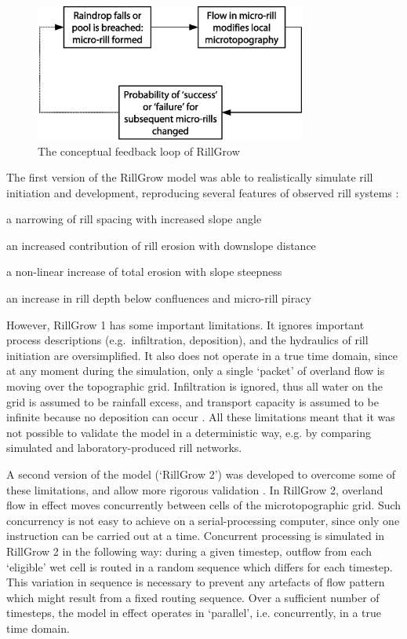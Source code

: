 \begin{figure}[htbp]
  \centering
    \includegraphics[width=0.80\textwidth]
{./img/rillgrow_feedback_concept}
  \caption[The conceptual feedback loop of RillGrow]{The conceptual
feedback loop of RillGrow \citep[From][]{favis1998-353}}
  \label{fig:rillgrow_feedback_concept}
\end{figure}

The first version of the RillGrow model was able to realistically simulate rill
initiation and development, reproducing several features of observed rill
systems \citep{favis-mortlock1996-248,favis1998-353}:
\begin{enumerate*}
  \item a narrowing of rill spacing with increased slope angle
  \item an increased contribution of rill erosion with downslope distance
  \item a non-linear increase of total erosion with slope steepness
  \item an increase in rill depth below confluences and micro-rill piracy
\end{enumerate*}

However, RillGrow 1 has some important limitations. It ignores important process
descriptions (e.g.\ infiltration, deposition), and the hydraulics of rill
initiation are oversimplified. It also does not operate in a true time domain,
since at any moment during the simulation, only a single `packet' of overland
flow is moving over the topographic grid. Infiltration is ignored, thus all
water on the grid is assumed to be rainfall excess, and transport capacity is
assumed to be infinite because no deposition can occur \citep{favis2000-2173}.
All these limitations meant that it was not possible to validate the model in a
deterministic way, e.g. by comparing simulated and laboratory-produced rill
networks.

A second version of the model (`RillGrow 2') was developed to overcome some of
these limitations, and allow more rigorous validation \citep{favis2000-2173}. In
RillGrow 2, overland flow in effect moves concurrently between cells of the
microtopographic grid. Such concurrency is not easy to achieve on a
serial-processing computer, since only one instruction can be carried out at a
time. Concurrent processing is simulated in RillGrow 2 in the following way:
during a given timestep, outflow from each `eligible' wet cell is routed in a
random sequence which differs for each timestep. This variation in sequence is
necessary to prevent any artefacts of flow pattern which might result from a
fixed routing sequence. Over a sufficient number of timesteps, the model in
effect operates in `parallel', i.e. concurrently, in a true time domain.

